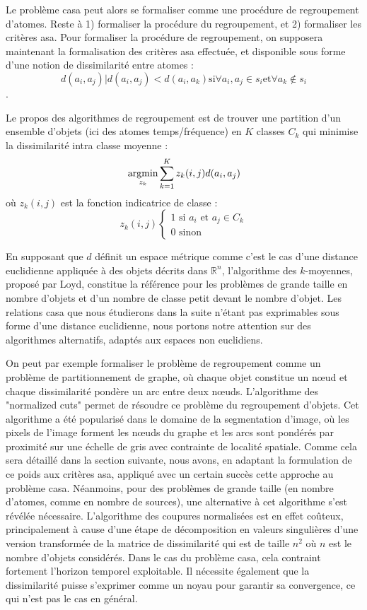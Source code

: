   Le problème casa peut alors se formaliser comme une procédure de regroupement d'atomes. Reste à 1) formaliser la procédure du regroupement, et 2) formaliser les critères asa. Pour formaliser la procédure de regroupement, on supposera maintenant la formalisation des critères asa effectuée, et disponible sous forme d'une notion de dissimilarité entre atomes : $$d(a_i, a_j) | d(a_i, a_j) < d(a_i, a_k) \text{si} \forall a_i, a_j \in s_i \text{et} \forall a_k \notin s_i$$.

  Le propos des algorithmes de regroupement est de trouver une partition d'un ensemble d'objets (ici des atomes temps/fréquence) en $K$ classes $C_k$ qui minimise la dissimilarité intra classe moyenne :
  \begin{equation}
    \operatorname*{argmin}_{z_k} \sum_{k=1}^{K} z_k(i, j) d(a_i, a_j)
  \end{equation}
  où $z_k(i, j)$ est la fonction indicatrice de classe :
  \begin{equation}
    z_k(i, j)
    \begin{cases}
      1 \text{ si } a_i \text{ et } a_j \in C_k \\
      0 \text{ sinon}
    \end{cases}
  \end{equation}

  En supposant que $d$ définit un espace métrique comme c'est le cas d'une distance euclidienne appliquée à des objets décrits dans $\mathbb{R}^n$, l'algorithme des $k$-moyennes, proposé par Loyd\cite{lloyd1982least}, constitue la référence pour les problèmes de grande taille en nombre d'objets et d'un nombre de classe petit devant le nombre d'objet. Les relations casa que nous étudierons dans la suite n'étant pas exprimables sous forme d'une distance euclidienne, nous portons notre attention sur des algorithmes alternatifs, adaptés aux espaces non euclidiens.

  On peut par exemple formaliser le problème de regroupement comme un problème de partitionnement de graphe, où chaque objet constitue un n\oe{}ud et chaque dissimilarité pondère un arc entre deux n\oe{}uds. L'algorithme des "normalized cuts" permet de résoudre ce problème du regroupement d'objets. Cet algorithme a été popularisé dans le domaine de la segmentation d'image\cite{shi2000normalized}, où les pixels de l'image forment les n\oe{}uds du graphe et les arcs sont pondérés par proximité sur une échelle de gris avec contrainte de localité spatiale. Comme cela sera détaillé dans la section suivante, nous avons, en adaptant la formulation de ce poids aux critères asa, appliqué avec un certain succès cette approche au problème casa. Néanmoins, pour des problèmes de grande taille (en nombre d'atomes, comme en nombre de sources), une alternative à cet algorithme s'est révélée nécessaire. L'algorithme des coupures normalisées est en effet coûteux, principalement à cause d'une étape de décomposition en valeurs singulières d'une version transformée de la matrice de dissimilarité qui est de taille $n^2$ où $n$ est le nombre d'objets considérés. Dans le cas du problème casa, cela contraint fortement l'horizon temporel exploitable. Il nécessite également que la dissimilarité puisse s'exprimer comme un noyau pour garantir sa convergence, ce qui n'est pas le cas en général.

